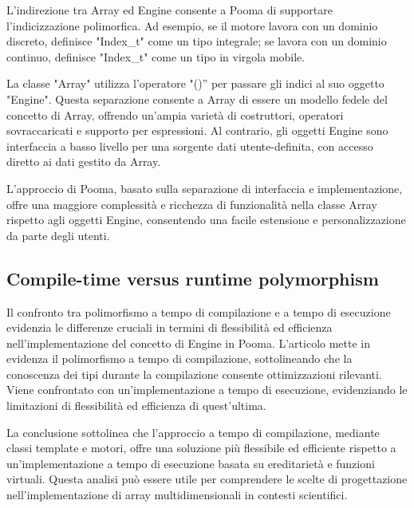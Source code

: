 \documentclass[11pt]{article}
\begin{document}
\begin{multicols*}{2}[\columnsep=1cm]
    L'indirezione tra Array ed Engine consente a Pooma di supportare l'indicizzazione polimorfica. Ad esempio, se il motore lavora con un dominio discreto, definisce "Index\_t" come un tipo integrale; se lavora con un dominio continuo, definisce "Index\_t" come un tipo in virgola mobile.

    La classe "Array" utilizza l'operatore "()” per passare gli indici al suo oggetto "Engine". Questa separazione consente a Array di essere un modello fedele del concetto di Array, offrendo un'ampia varietà di costruttori, operatori sovraccaricati e supporto per espressioni. Al contrario, gli oggetti Engine sono interfaccia a basso livello per una sorgente dati utente-definita, con accesso diretto ai dati gestito da Array.

    L'approccio di Pooma, basato sulla separazione di interfaccia e implementazione, offre una maggiore complessità e ricchezza di funzionalità nella classe Array rispetto agli oggetti Engine, consentendo una facile estensione e personalizzazione da parte degli utenti.
    
    \subsection{Compile-time versus runtime polymorphism}
    Il confronto tra polimorfismo a tempo di compilazione e a tempo di esecuzione evidenzia le differenze cruciali in termini di flessibilità ed efficienza nell'implementazione del concetto di Engine in Pooma.
    L'articolo mette in evidenza il polimorfismo a tempo di compilazione, sottolineando che la conoscenza dei tipi durante la compilazione consente ottimizzazioni rilevanti. Viene confrontato con un'implementazione a tempo di esecuzione, evidenziando le limitazioni di flessibilità ed efficienza di quest'ultima.

    La conclusione sottolinea che l'approccio a tempo di compilazione, mediante classi template e motori, offre una soluzione più flessibile ed efficiente rispetto a un'implementazione a tempo di esecuzione basata su ereditarietà e funzioni virtuali. Questa analisi può essere utile per comprendere le scelte di progettazione nell'implementazione di array multidimensionali in contesti scientifici.

\end{multicols*}
\end{document}
